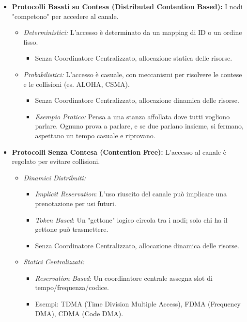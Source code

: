 \documentclass{article}
\begin{document}
\begin{itemize}
    \item \textbf{Protocolli Basati su Contesa (Distributed Contention Based):} I nodi "competono" per accedere al canale.
    \begin{itemize}
        \item \textit{Deterministici:} L'accesso è determinato da un mapping di ID o un ordine fisso.
        \begin{itemize}
            \item Senza Coordinatore Centralizzato, allocazione statica delle risorse.
        \end{itemize}
        \item \textit{Probabilistici:} L'accesso è casuale, con meccanismi per risolvere le contese e le collisioni (es. ALOHA, CSMA).
        \begin{itemize}
            \item Senza Coordinatore Centralizzato, allocazione dinamica delle risorse.
            \item \textit{Esempio Pratico:} Pensa a una stanza affollata dove tutti vogliono parlare. Ognuno prova a parlare, e se due parlano insieme, si fermano, aspettano un tempo casuale e riprovano.
        \end{itemize}
    \end{itemize}
    \item \textbf{Protocolli Senza Contesa (Contention Free):} L'accesso al canale è regolato per evitare collisioni.
    \begin{itemize}
        \item \textit{Dinamici Distribuiti:}
        \begin{itemize}
            \item \textit{Implicit Reservation}: L'uso riuscito del canale può implicare una prenotazione per usi futuri.
            \item \textit{Token Based}: Un "gettone" logico circola tra i nodi; solo chi ha il gettone può trasmettere.
            \item Senza Coordinatore Centralizzato, allocazione dinamica delle risorse.
        \end{itemize}
        \item \textit{Statici Centralizzati:}
        \begin{itemize}
            \item \textit{Reservation Based}: Un coordinatore centrale assegna slot di tempo/frequenza/codice.
            \item Esempi: TDMA (Time Division Multiple Access), FDMA (Frequency DMA), CDMA (Code DMA).

\end{itemize}
\end{itemize}
\end{itemize}
\end{document}
